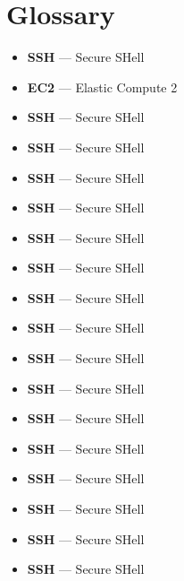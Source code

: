 \chapter{Glossary}

\begin{itemize}
    \item \textbf{SSH} — Secure SHell
    \item  \textbf{EC2} — Elastic Compute 2
    \item  \textbf{SSH} — Secure SHell
    \item  \textbf{SSH} — Secure SHell
    \item  \textbf{SSH} — Secure SHell
    \item  \textbf{SSH} — Secure SHell
    \item  \textbf{SSH} — Secure SHell
    \item  \textbf{SSH} — Secure SHell
    \item  \textbf{SSH} — Secure SHell
    \item  \textbf{SSH} — Secure SHell
    \item  \textbf{SSH} — Secure SHell
    \item  \textbf{SSH} — Secure SHell
    \item  \textbf{SSH} — Secure SHell
    \item  \textbf{SSH} — Secure SHell
    \item  \textbf{SSH} — Secure SHell
    \item  \textbf{SSH} — Secure SHell
    \item  \textbf{SSH} — Secure SHell
    \item  \textbf{SSH} — Secure SHell
\end{itemize}